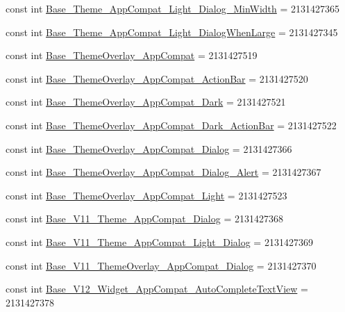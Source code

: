 \begin{CompactItemize}
\item 
const int \hyperlink{class__2doo_1_1_droid_1_1_resource_1_1_style_309a32211cd6d6a50f019d4f0d3004ad}{Base\_\-Theme\_\-AppCompat\_\-Light\_\-Dialog\_\-MinWidth} = 2131427365
\item 
const int \hyperlink{class__2doo_1_1_droid_1_1_resource_1_1_style_702116b4b7096bbe285f9a70ef863a7f}{Base\_\-Theme\_\-AppCompat\_\-Light\_\-DialogWhenLarge} = 2131427345
\item 
const int \hyperlink{class__2doo_1_1_droid_1_1_resource_1_1_style_c53dc3ab0c51906c52d0231fc4b7cf80}{Base\_\-ThemeOverlay\_\-AppCompat} = 2131427519
\item 
const int \hyperlink{class__2doo_1_1_droid_1_1_resource_1_1_style_aa33d32b7bc3a8de119527c2df7a3cb1}{Base\_\-ThemeOverlay\_\-AppCompat\_\-ActionBar} = 2131427520
\item 
const int \hyperlink{class__2doo_1_1_droid_1_1_resource_1_1_style_9c5b254c3e211561954080d592bccf49}{Base\_\-ThemeOverlay\_\-AppCompat\_\-Dark} = 2131427521
\item 
const int \hyperlink{class__2doo_1_1_droid_1_1_resource_1_1_style_a48590d817b6f885315c8d6a51f4bdba}{Base\_\-ThemeOverlay\_\-AppCompat\_\-Dark\_\-ActionBar} = 2131427522
\item 
const int \hyperlink{class__2doo_1_1_droid_1_1_resource_1_1_style_ebb5820490441c300184135976a86052}{Base\_\-ThemeOverlay\_\-AppCompat\_\-Dialog} = 2131427366
\item 
const int \hyperlink{class__2doo_1_1_droid_1_1_resource_1_1_style_ba5af23eb011aec6de600271b5fa4269}{Base\_\-ThemeOverlay\_\-AppCompat\_\-Dialog\_\-Alert} = 2131427367
\item 
const int \hyperlink{class__2doo_1_1_droid_1_1_resource_1_1_style_3daf8a10a4e7fc6224fb18aefc710fdd}{Base\_\-ThemeOverlay\_\-AppCompat\_\-Light} = 2131427523
\item 
const int \hyperlink{class__2doo_1_1_droid_1_1_resource_1_1_style_2f43b909753e257a37ad9d4a14ad6691}{Base\_\-V11\_\-Theme\_\-AppCompat\_\-Dialog} = 2131427368
\item 
const int \hyperlink{class__2doo_1_1_droid_1_1_resource_1_1_style_82c0c94601dfce77429a1b700b7173d3}{Base\_\-V11\_\-Theme\_\-AppCompat\_\-Light\_\-Dialog} = 2131427369
\item 
const int \hyperlink{class__2doo_1_1_droid_1_1_resource_1_1_style_65628c8283dc1b8236da50e28fb6a2b8}{Base\_\-V11\_\-ThemeOverlay\_\-AppCompat\_\-Dialog} = 2131427370
\item 
const int \hyperlink{class__2doo_1_1_droid_1_1_resource_1_1_style_5414626a1c2de626e5436e17f02a4b47}{Base\_\-V12\_\-Widget\_\-AppCompat\_\-AutoCompleteTextView} = 2131427378

\end{CompactItemize}
